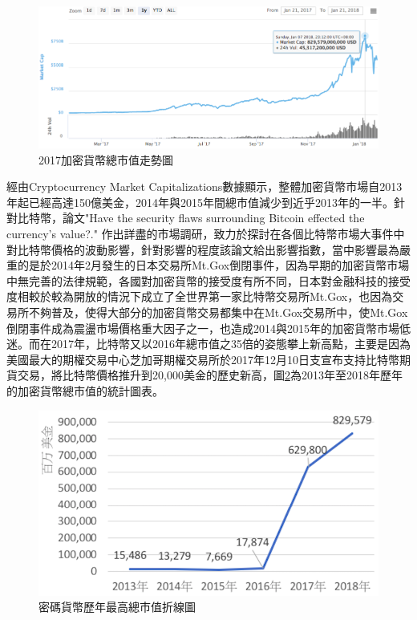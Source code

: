 	\begin{figure}[h]
		\centering
		\includegraphics[width = .9\textwidth]{TotalMarketCapitalization.png}
		\caption{2017加密貨幣總市值走勢圖\supercite{CryptocurrencyMarketCapitalizations}}\label{TotalMarketCapitalization}
	\end{figure}

	經由Cryptocurrency Market Capitalizations數據顯示，整體加密貨幣市場自2013年起已經高達150億美金，2014年與2015年間總市值減少到近乎2013年的一半。針對比特幣，論文"Have the security flaws surrounding Bitcoin effected the currency's value?."
	\supercite{HavethesecurityflawssurroundingBITCOINeffectedthecurrencysvalue?}
	作出詳盡的市場調研，致力於探討在各個比特幣市場大事件中對比特幣價格的波動影響，針對影響的程度該論文給出影響指數，當中影響最為嚴重的是於2014年2月發生的日本交易所Mt.Gox倒閉事件，因為早期的加密貨幣市場中無完善的法律規範，各國對加密貨幣的接受度有所不同，日本對金融科技的接受度相較於較為開放的情況下成立了全世界第一家比特幣交易所Mt.Gox，也因為交易所不夠普及，使得大部分的加密貨幣交易都集中在Mt.Gox交易所中，使Mt.Gox 倒閉事件成為震盪市場價格重⼤因⼦之⼀，也造成2014與2015年的加密貨幣市場低迷。而在2017年，比特幣又以2016年總市值之35倍的姿態攀上新高點，主要是因為美國最大的期權交易中心芝加哥期權交易所於2017年12月10日支宣布支持比特幣期貨交易，將比特幣價格推升到20,000美金的歷史新高，圖\ref{Thetotalmarketcapitalization}為2013年至2018年歷年的加密貨幣總市值的統計圖表。

		\begin{figure}[h]
			\centering
			\includegraphics[width = .7\textwidth]{Thetotalmarketcapitalization.png}
			\caption{密碼貨幣歷年最高總市值折線圖\supercite{CryptocurrencyMarketCapitalizations}}\label{Thetotalmarketcapitalization}
		\end{figure}
	

